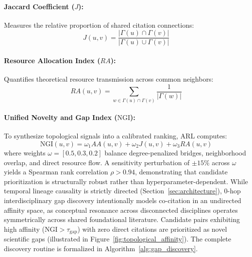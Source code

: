 \documentclass[10pt,twocolumn,letterpaper]{article}
\begin{document}
\paragraph{Jaccard Coefficient ($J$):}
Measures the relative proportion of shared citation connections:
\begin{equation}
J(u, v) = \frac{|\Gamma(u) \cap \Gamma(v)|}{|\Gamma(u) \cup \Gamma(v)|}
\end{equation}

\paragraph{Resource Allocation Index ($RA$):}
Quantifies theoretical resource transmission across common neighbors:
\begin{equation}
RA(u, v) = \sum_{w \in \Gamma(u) \cap \Gamma(v)} \frac{1}{|\Gamma(w)|}
\end{equation}

\paragraph{Unified Novelty and Gap Index ($\text{NGI}$):}
To synthesize topological signals into a calibrated ranking, ARL computes:
\begin{equation}
\text{NGI}(u, v) = \omega_1 AA(u, v) + \omega_2 J(u, v) + \omega_3 RA(u, v)
\end{equation}
where weights $\omega = [0.5, 0.3, 0.2]$ balance degree-penalized bridges, neighborhood overlap, and direct resource flow. A sensitivity perturbation of $\pm 15\%$ across $\omega$ yields a Spearman rank correlation $\rho > 0.94$, demonstrating that candidate prioritization is structurally robust rather than hyperparameter-dependent. While temporal lineage causality is strictly directed (Section~\ref{sec:architecture}), 0-hop interdisciplinary gap discovery intentionally models co-citation in an undirected affinity space, as conceptual resonance across disconnected disciplines operates symmetrically across shared foundational literature. Candidate pairs exhibiting high affinity ($\text{NGI} > \tau_{\text{gap}}$) with zero direct citations are prioritized as novel scientific gaps (illustrated in Figure~\ref{fig:topological_affinity}). The complete discovery routine is formalized in Algorithm~\ref{alg:gap_discovery}.
\end{document}
